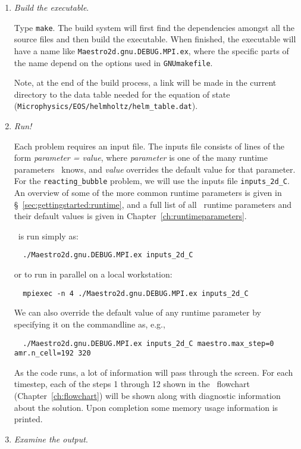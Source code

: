 \begin{enumerate}
\item {\em Build the executable}.

  Type {\tt make}.  The build system will first find the dependencies
  amongst all the source files and then build the executable.  When
  finished, the executable will have a name like
  {\tt Maestro2d.gnu.DEBUG.MPI.ex}, where the specific parts of the name
  depend on the options used in {\tt GNUmakefile}.

  Note, at the end of the build process, a link will be made in the
  current directory to the data table needed for the equation of state
  ({\tt Microphysics/EOS/helmholtz/helm\_table.dat}).


\item {\em Run!}

  Each problem requires an input file.  The inputs file
  consists of lines of the form {\em parameter = value},
  where {\em parameter} is one of the many runtime parameters
  \maestroex\ knows, and {\em value} overrides the default value for
  that parameter.  For the {\tt reacting\_bubble} problem, we will use
  the inputs file {\tt inputs\_2d\_C}.  An overview of some of the more
  common runtime parameters is given in
  \S~\ref{sec:gettingstarted:runtime}, and a full list of all
  \maestroex\ runtime parameters and their default values is given in
  Chapter~\ref{ch:runtimeparameters}.

  \maestroex\ is run simply as:
  \begin{verbatim}
  ./Maestro2d.gnu.DEBUG.MPI.ex inputs_2d_C
  \end{verbatim}
  or to run in parallel on a local workstation:
  \begin{verbatim}
  mpiexec -n 4 ./Maestro2d.gnu.DEBUG.MPI.ex inputs_2d_C
  \end{verbatim}
  We can also override the default value of any runtime parameter by
  specifying it on the commandline as, e.g.,
  \begin{verbatim}
  ./Maestro2d.gnu.DEBUG.MPI.ex inputs_2d_C maestro.max_step=0 amr.n_cell=192 320
  \end{verbatim}

  As the code runs, a lot of information will pass through the screen.
  For each timestep, each of the steps 1 through 12 shown in the
  \maestroex\ flowchart (Chapter~\ref{ch:flowchart}) will be shown along
  with diagnostic information about the solution.  Upon completion
  some memory usage information is printed.


\item {\em Examine the output}.
  

\end{enumerate}
